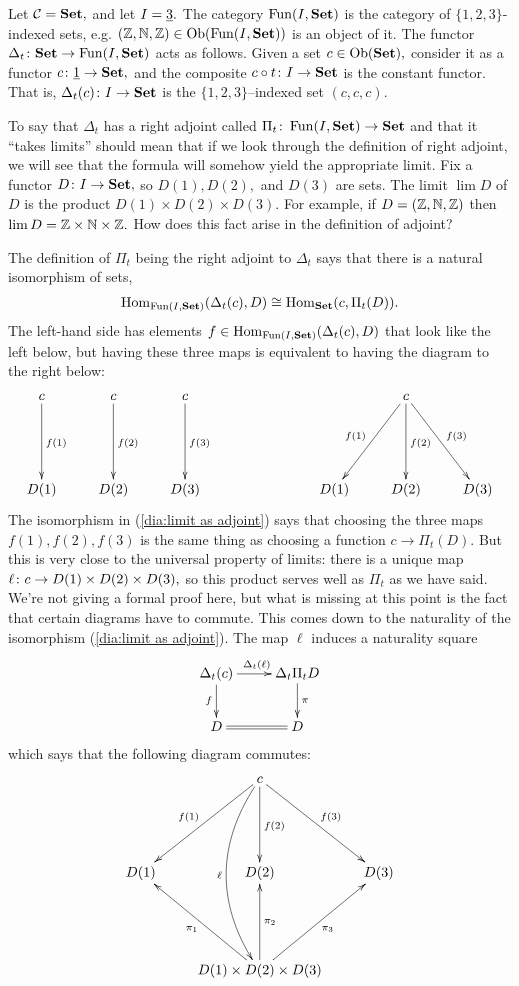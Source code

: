 \documentclass[CT4S-EN-RU]{subfiles}
\begin{document}
\begin{exampleENG}
Let $\mathcal{C}={\mathbf{Set}},$ and let $I=\underline{3}.$ The category $\operatorname{Fun}(I,{\mathbf{Set}})$ is the category of $\{1,2,3\}$-indexed sets, e.g. $({\mathbb Z},{\mathbb N},{\mathbb Z})\in\operatorname{Ob}(\operatorname{Fun}(I,{\mathbf{Set}}))$ is an object of it. The functor $\Delta_t\colon{\mathbf{Set}}\rightarrow\operatorname{Fun}(I,{\mathbf{Set}})$ acts as follows. Given a set $c\in\operatorname{Ob}({\mathbf{Set}}),$ consider it as a functor $c\colon\underline{1}\rightarrow{\mathbf{Set}},$ and the composite $c\circ t\colon I\rightarrow{\mathbf{Set}}$ is the constant functor. That is, $\Delta_t(c)\colon I\rightarrow{\mathbf{Set}}$ is the $\{1,2,3\}$--indexed set $(c,c,c).$

To say that $\Delta_t$ has a right adjoint called $\Pi_t\colon\operatorname{Fun}(I,{\mathbf{Set}})\rightarrow{\mathbf{Set}}$ and that it “takes limits” should mean that if we look through the definition of right adjoint, we will see that the formula will somehow yield the appropriate limit. Fix a functor $D\colon I\rightarrow{\mathbf{Set}},$ so $D(1),D(2),$ and $D(3)$ are sets. The limit $\lim D$ of $D$ is the product $D(1)\times D(2)\times D(3).$ For example, if $D=({\mathbb Z},{\mathbb N},{\mathbb Z})$ then $\lim D={\mathbb Z}\times{\mathbb N}\times{\mathbb Z}.$ How does this fact arise in the definition of adjoint?

The definition of $\Pi_t$ being the right adjoint to $\Delta_t$ says that there is a natural isomorphism of sets, 
\begin{align}\label{dia:limit as adjoint}
\operatorname{Hom}_{\operatorname{Fun}(I,{\mathbf{Set}})}(\Delta_t(c),D)\cong\operatorname{Hom}_{\mathbf{Set}}(c,\Pi_t(D)).
\end{align}
The left-hand side has elements $f\in\operatorname{Hom}_{\operatorname{Fun}(I,{\mathbf{Set}})}(\Delta_t(c),D)$ that look like the left below, but having these three maps is equivalent to having the diagram to the right below:
$$\xymatrix{
c\ar[dd]^{f(1)}&c\ar[dd]^{f(2)}&c\ar[dd]^{f(3)}\\\\
D(1)&D(2)&D(3)
}
\hspace{1in}
\xymatrix{
&c\ar[ddl]_{f(1)}\ar[dd]^{f(2)}\ar[ddr]^{f(3)}\\\\
D(1)&D(2)&D(3)
}$$
The isomorphism in (\ref{dia:limit as adjoint}) says that choosing the three maps $f(1),f(2),f(3)$ is the same thing as choosing a function $c\to\Pi_t(D).$ But this is very close to the universal property of limits: there is a unique map $\ell\colon c\rightarrow D(1)\times D(2)\times D(3),$ so this product serves well as $\Pi_t$ as we have said. We're not giving a formal proof here, but what is missing at this point is the fact that certain diagrams have to commute. This comes down to the naturality of the isomorphism (\ref{dia:limit as adjoint}). The map $\ell$ induces a naturality square
$$\xymatrix{\Delta_t(c)\ar[r]^{\Delta_t(\ell)}\ar[d]_f&\Delta_t\Pi_tD\ar[d]^\pi\\D\ar@{=}[r]&D}$$
which says that the following diagram commutes:
$$\xymatrix{&c\ar[ddl]_{f(1)}\ar[dd]^{f(2)}\ar[ddr]^{f(3)}\ar@/_2pc/[dddd]_\ell\\\\
D(1)&D(2)&D(3)\\\\
&D(1)\times D(2)\times D(3)\ar[uul]^{\pi_1}\ar[uu]_{\pi_2}\ar[uur]_{\pi_3}
}$$
\end{exampleENG}
\end{document}
